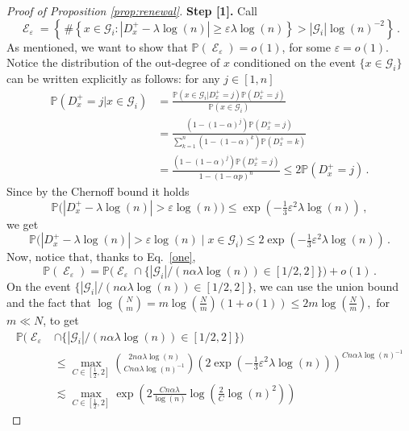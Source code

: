 \documentclass[11pt,oneside]{amsart}
\numberwithin{equation}{section}  %
\theoremstyle{plain}
\newcommand{\eps}{\varepsilon}
\DeclareMathOperator{\cE}{\mathcal{E}}
\newcommand{\p}{\mathbb{P}}
\newcommand{\gates}{\mathcal{G}}
\begin{document}
\begin{proof}[Proof of Proposition \ref{prop:renewal}]
{\bf Step [1].} Call 
	$$\cE_\varepsilon=\left\{ \,\#\!\left\{x\in \gates_i : \left|D_x^+-\lambda\log(n)\right| \ge \varepsilon\lambda\log(n) \right\}>|\gates_i|\log(n)^{-2} \right\}\,.$$
	As mentioned, we want to show that $\p(\cE_\varepsilon)=o(1)$, for some $\eps=o(1)$. Notice the distribution of the out-degree of $x$ conditioned on the event $\{x\in\gates_i\}$ can be written explicitly as follows: for any $j\in[1,n]$
	\begin{equation} \begin{split}
		\p(D_x^+=j|x \in \gates_i)&
		=\frac{\p(x \in \gates_i|D_x^+=j)\p(D_x^+=j)}{\p(x \in \gates_i)}\\
		&=\frac{(1-(1-\alpha)^j)\p(D_x^+=j)}{\sum_{k=1}^n(1-(1-\alpha)^k)\p(D_x^+=k)}\\
		&=\frac{(1-(1-\alpha)^j)\p(D_x^+=j)}{1-(1-\alpha p)^{n}}
		\le 2\p(D_x^+=j)\,.
	\end{split}
	\end{equation}
	Since by the Chernoff bound it holds
	\begin{equation}
		\p\big(|D_x^+-\lambda\log(n)|>\varepsilon\log(n)\big)\le \exp\left(-\tfrac13\varepsilon^2\lambda\log(n)\right)\,,
	\end{equation}
	we get
	\begin{equation}
		\p\big(|D_x^+-\lambda\log(n)|>\varepsilon\log(n)\mid x\in\gates_i\big)\le 2\exp\left(-\tfrac13\varepsilon^2\lambda\log(n)\right)\,.
	\end{equation}
	Now, notice that, thanks to Eq.~\eqref{one},
	\begin{equation}
		\p(\cE_\varepsilon)=\p\big(\cE_\varepsilon\cap\{|\gates_i|/(n\alpha\lambda\log(n))\in[1/2,2]\}\big)+o(1)\,.
	\end{equation}
	On the event $\{|\gates_i|/(n\alpha\lambda\log(n))\in[1/2,2]\}$, we can use the union bound and the fact that $\log\binom{N}{m}=m \log(\frac{N}{m})(1+o(1))\le 2m\log(\frac{N}{m}),$ for $m \ll N$, to get
	\begin{equation}
		\begin{split}
			\p\big(\cE_\varepsilon&\cap\{|\gates_i|/(n\alpha\lambda\log(n))\in[1/2,2]\}\big)\\
			& \le \max_{C \in \left[\frac{1}{2},2\right]}\binom{2n\alpha\lambda\log(n)}{C n\alpha\lambda\log(n)^{-1}}\left(2\exp\left(-\tfrac13 \varepsilon^2\lambda \log(n)\right)\right)^{C n\alpha \lambda\log(n)^{-1}} \\
             & \lesssim \max_{C \in \left[\frac{1}{2},2\right]}\exp{\left(2\frac{C n\alpha\lambda}{\log(n)} \log \left(\frac2C\log(n)^2\right)\right)}

\end{split}
\end{equation}
\end{proof}
\end{document}
